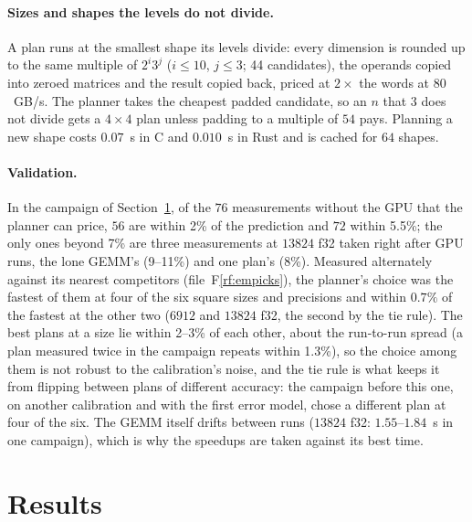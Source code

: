 \documentclass[11pt]{article}
\newcommand{\rf}[1]{F\ref{rf:#1}}
\begin{document}
\paragraph{Sizes and shapes the levels do not divide.}
A plan runs at the smallest shape its levels divide: every dimension is
rounded up to the same multiple of $2^i3^j$ ($i\le10$, $j\le3$; 44 candidates),
the operands copied into zeroed matrices and the result copied back, priced at
$2\times$ the words at $80$~GB/s.  The planner takes the cheapest padded
candidate, so an $n$ that $3$ does not divide gets a $4\times4$ plan unless
padding to a multiple of $54$ pays.  Planning a new shape costs $0.07$~s in C
and $0.010$~s in Rust and is cached for $64$ shapes.

\paragraph{Validation.}
In the campaign of Section~\ref{sec:results}, of the $76$ measurements
without the GPU that the planner can price, $56$ are within 2\% of the
prediction and $72$ within 5.5\%; the only ones beyond 7\% are three
measurements at $13824$ f32 taken right after GPU runs, the lone GEMM's (9--11\%) and one plan's (8\%).  Measured alternately against its nearest competitors (file~\rf{empicks}), the planner's choice was the fastest of them at
four of the six square sizes and precisions and within $0.7\%$ of the fastest at the other two ($6912$ and $13824$ f32, the second by the tie rule).  The best plans at a size lie within 2--3\% of each
other, about the run-to-run spread (a plan measured twice in the campaign
repeats within 1.3\%), so the choice among them is not robust to the
calibration's noise, and the tie rule is what keeps it from flipping between
plans of different accuracy: the campaign before this one, on another calibration and with the first error model, chose a different plan at four of the six.  The GEMM itself drifts between runs
($13824$ f32: $1.55$--$1.84$~s in one campaign), which is why the speedups
are taken against its best time.

\section{Results}\label{sec:results}
\end{document}
